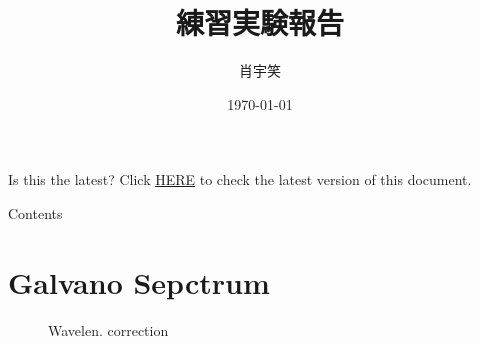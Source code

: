 \documentclass[aspectratio=43,scheme=plain]{ctexbeamer}
\title{練習実験報告}
\author{肖宇笑}
\date{\today}
\begin{document}
	\maketitle 						   %
	\begin{frame}{Is this the latest?}
		\thispagestyle{empty}
		Click \textcolor{blue}{\href{https://github.com/xiaoyuleiba/MachinetimeReport}{HERE}} to check the latest version of this document.
	\end{frame}
	\begin{frame}{Contents}
	\tableofcontents
	\end{frame}
	\section{Galvano Sepctrum}	
	\begin{frame}{\insertsection}
		\begin{figure}[H]
			\centering
			\caption{Wavelen. correction}
		\end{figure}
	\end{frame}
\end{document}
